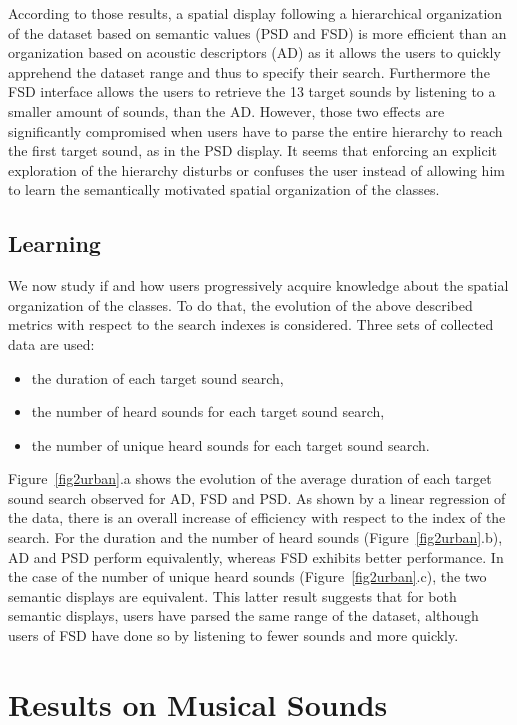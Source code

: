 \documentclass{aes2e}
\begin{document}
According to those results, a spatial display following a hierarchical organization of the dataset based on semantic values (PSD and FSD) is more efficient than an organization based on acoustic descriptors (AD) as it allows the users to quickly apprehend the dataset range and thus to specify their search. Furthermore the FSD interface allows the users to retrieve the 13 target sounds by listening to a smaller amount of sounds, than the AD. However, those two effects are significantly compromised when users have to parse the entire hierarchy to reach the first target sound, as in the PSD display. It seems that enforcing an explicit exploration of the hierarchy disturbs or confuses the user instead of allowing him to learn the semantically motivated spatial organization of the classes. 


\subsection{Learning}

We now study if and how users progressively acquire knowledge about the spatial organization of the classes. To do that, the evolution of the above described metrics with respect to the search indexes is considered. Three sets of collected data are used:

\begin{itemize}
\item the duration of each target sound search,
\item the number of heard sounds for each target sound search,
\item the number of unique heard sounds for each target sound search. 
\end{itemize}

Figure~\ref{fig2urban}.a shows the evolution of the average duration of each target sound search observed for AD, FSD and PSD. As shown by a linear regression of the data, there is an overall increase of efficiency with respect to the index of the search. For the duration and the number of heard sounds (Figure~\ref{fig2urban}.b), AD and PSD perform equivalently, whereas FSD exhibits better performance. In the case of the number of unique heard sounds (Figure~\ref{fig2urban}.c), the two semantic displays are equivalent. This latter result suggests that for both semantic displays, users have parsed the same range of the dataset, although users of FSD have done so by listening to fewer sounds and more quickly. 

\section{Results on Musical Sounds} \label{resultsm}
\end{document}
